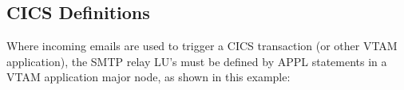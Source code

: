 \documentclass[letterpaper,10pt,english]{sphinxmanual}
\begin{document}
\sphinxAtStartPar
{}

\ignorespaces 

\subsection{CICS Definitions}
\label{\detokenize{connectivity_guide:index-21}}\label{\detokenize{connectivity_guide:id6}}
\sphinxAtStartPar
Where incoming e\sphinxhyphen{}mails are used to trigger a CICS transaction (or other VTAM application), the SMTP relay LU’s must be defined by APPL statements in a VTAM application major node, as shown in this example:
\end{document}

